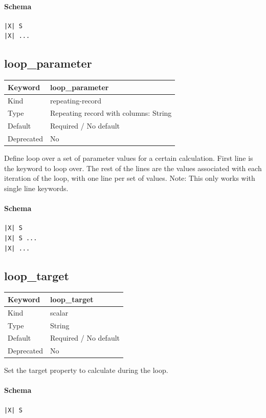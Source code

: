 \documentclass[11pt]{article}
\begin{document}
{{{{{\paragraph{Schema}
\begin{Verbatim}
|X| S
|X| ...
\end{Verbatim}

\subsection{loop\_parameter}
\label{kw:loop-parameter}
\begin{longtable}{|p{1.5in}|p{4.5in}|}
\hline
Keyword & loop\_parameter \\
\hline
Kind & repeating-record \\
\hline
Type & Repeating record with columns: String \\
\hline
Default & Required / No default \\
\hline
Deprecated & No \\
\hline
\end{longtable}
 Define loop over a set of parameter values
 for a certain calculation.
 First line is the keyword to loop over.
 The rest of the lines are the values
 associated with each iteration of the loop,
 with one line per set of values.
 Note: This only works with single line
 keywords.

\paragraph{Schema}
\begin{Verbatim}
|X| S
|X| S ...
|X| ...
\end{Verbatim}

\subsection{loop\_target}
\label{kw:loop-target}
\begin{longtable}{|p{1.5in}|p{4.5in}|}
\hline
Keyword & loop\_target \\
\hline
Kind & scalar \\
\hline
Type & String \\
\hline
Default & Required / No default \\
\hline
Deprecated & No \\
\hline
\end{longtable}
 Set the target property to calculate during
 the loop.

\paragraph{Schema}
\begin{Verbatim}
|X| S
\end{Verbatim}

}}}}}
\end{document}
